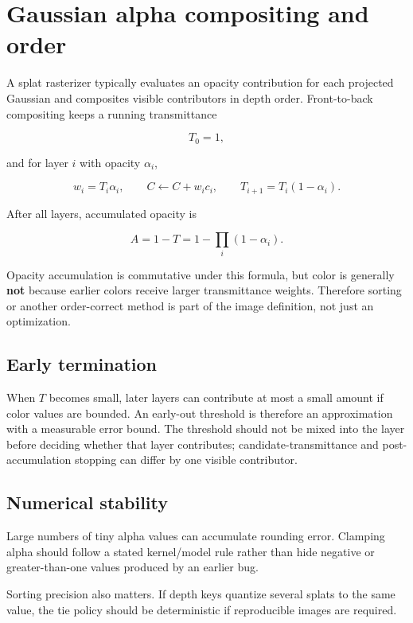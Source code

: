 \hypertarget{appendix-5f4b2e24c3f6}{}\label{referencestart:appendix-5f4b2e24c3f6}
\section{Gaussian alpha compositing and order}\label{appendix-5f4b2e24c3f6-gaussian-alpha-compositing-and-order}

A splat rasterizer typically evaluates an opacity contribution for each projected Gaussian and composites visible contributors in depth order. Front-to-back compositing keeps a running transmittance

\[
T_0=1,
\]

and for layer \(i\) with opacity \(\alpha_i\),

\[
w_i=T_i\alpha_i,
\qquad
C \leftarrow C+w_i c_i,
\qquad
T_{i+1}=T_i(1-\alpha_i).
\]

After all layers, accumulated opacity is

\[
A=1-T
=
1-\prod_i(1-\alpha_i).
\]

Opacity accumulation is commutative under this formula, but color is generally \textbf{not} because earlier colors receive larger transmittance weights. Therefore sorting or another order-correct method is part of the image definition, not just an optimization.

\subsection{Early termination}\label{appendix-5f4b2e24c3f6-early-termination}

When \(T\) becomes small, later layers can contribute at most a small amount if color values are bounded. An early-out threshold is therefore an approximation with a measurable error bound. The threshold should not be mixed into the layer before deciding whether that layer contributes; candidate-transmittance and post-accumulation stopping can differ by one visible contributor.

\subsection{Numerical stability}\label{appendix-5f4b2e24c3f6-numerical-stability}

Large numbers of tiny alpha values can accumulate rounding error. Clamping alpha should follow a stated kernel/model rule rather than hide negative or greater-than-one values produced by an earlier bug.

Sorting precision also matters. If depth keys quantize several splats to the same value, the tie policy should be deterministic if reproducible images are required.

